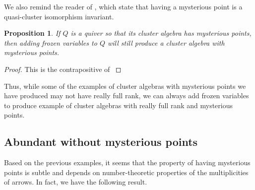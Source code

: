 \documentclass{amsart}
\numberwithin{equation}{section}
\newtheorem{proposition}[theorem]{Proposition}
\theoremstyle{definition}
\begin{document}
We also remind the reader of \cite[Propositions~3.15-16]{deep}, which state that having a mysterious point is a quasi-cluster isomorphism invariant.


\begin{proposition}\label{prop:adding-frozen-variables}
If $Q$ is a quiver so that its cluster algebra has mysterious points, then adding frozen variables to $Q$ will still produce a cluster algebra with mysterious points. 
\end{proposition}

\begin{proof}
This is the contrapositive of \cite[Proposition 3.18]{deep}
\end{proof}

Thus, while some of the examples of cluster algebras with mysterious points we have produced may not have really full rank, we can always add frozen variables to produce example of cluster algebras with really full rank and mysterious points. 


\subsection{Abundant without mysterious points}
Based on the previous examples, it seems that the property of having mysterious points is subtle and depends on number-theoretic properties of the multiplicities of arrows. In fact, we have the following result. 
\end{document}

